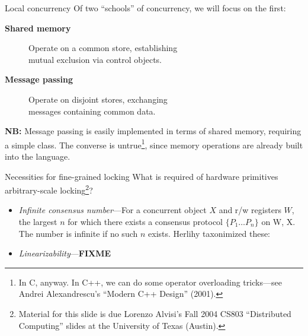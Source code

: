 \documentclass[mathserif,xcolor={dvipsnames,table}]{beamer}
\begin{document}
\begin{frame}{Local concurrency}
Of two ``schools'' of concurrency, we will focus on the first:
\vfill
\begin{description}
\item[\textbf{Shared memory}]\hfill{Operate on a common store, establishing\\ \hfill mutual exclusion via control objects.}
\item[\textbf{Message passing}]\hfill{Operate on disjoint stores, exchanging\\ \hfill messages containing common data.}
\end{description}
\vfill
\textbf{NB:} Message passing is easily implemented
in terms of shared memory, requiring a simple class. The converse is untrue\footnote{In C, anyway.
In C++, we can do some operator overloading tricks---see Andrei Alexandrescu's ``Modern C++ Design'' (2001).}, since
memory operations are already built into the language.
\end{frame}

\begin{frame}{Necessities for fine-grained locking}
What is required of hardware primitives arbitrary-scale locking\footnote{Material for this slide is due Lorenzo Alvisi's
Fall 2004 CS803 ``Distributed Computing'' slides at the University of Texas (Austin).}?
\vfill
\begin{itemize}
\item \textit{Infinite consensus number}---For a concurrent object $X$ and
r/w registers $W$, the largest $n$ for which there exists
a consensus protocol $\{P_1\ldots P_n\}$ on {W, X}. The number is infinite if no
such $n$ exists. Herlihy taxonimized these:
\begin{center}
\end{center}
\item \textit{Linearizability}---\textbf{FIXME}
\end{itemize}
\end{frame}
\end{document}
